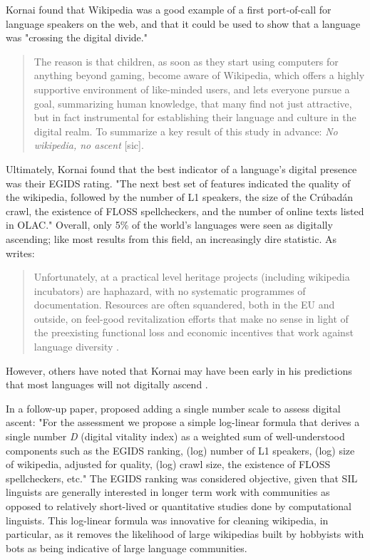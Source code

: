 Kornai found that Wikipedia was a good example of a first port-of-call for language speakers on the web, and that it could be used to show that a language was "crossing the digital divide."

\begin{quote}
The reason is that children, as soon as they start using computers for anything beyond gaming, become aware of Wikipedia, which offers a highly supportive environment of like-minded users, and lets everyone pursue a goal, summarizing human knowledge, that many find not just attractive, but in fact instrumental for establishing their language and culture in the digital realm. To summarize a key result of this study in advance: \emph{No wikipedia, no ascent} [sic]. \citep{kornai2013digital}
\end{quote}

Ultimately, Kornai found that the best indicator of a language's digital presence was their EGIDS rating. "The next best set of features indicated the quality of the wikipedia, followed by the number of L1 speakers, the size of the Cr\'ubad\'an crawl, the existence of FLOSS spellcheckers, and the number of online texts listed in OLAC." \citep[6]{kornai2013digital} Overall, only 5\% of the world's languages were seen as digitally ascending; like most results from this field, an increasingly dire statistic. As \citet[10]{kornai2013digital} writes:

\begin{quote}
Unfortunately, at a practical level heritage projects (including wikipedia incubators) are haphazard, with no systematic programmes of documentation. Resources are often squandered, both in the EU and outside, on feel-good revitalization efforts that make no sense in light of the preexisting functional loss and economic incentives that work against language diversity \citep{ginsburgh2011many}.
\end{quote}

However, others have noted that Kornai may have been early in his predictions that most languages will not digitally ascend \citep{gibson2016assessing}.

In a follow-up paper, \citep{kornai2015new} proposed adding a single number scale to assess digital ascent: "For the assessment we propose a simple log-linear formula that derives a single number {\emph D} (digital vitality index) as a weighted sum of well-understood components such as the EGIDS ranking, (log) number of L1 speakers, (log) size of wikipedia, adjusted for quality, (log) crawl size, the existence of FLOSS spellcheckers, etc." The EGIDS ranking was considered objective, given that SIL linguists are generally interested in longer term work with communities as opposed to relatively short-lived or quantitative studies done by computational linguists. This log-linear formula was innovative for cleaning wikipedia, in particular, as it removes the likelihood of large wikipedias built by hobbyists with bots as being indicative of large language communities.

